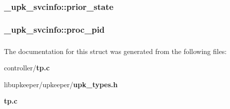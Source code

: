 \subsubsection[{prior\_\-state}]{ {\bf \_\-upk\_\-svcinfo::prior\_\-state}}\label{struct__upk__svcinfo_a771e32befacb58b96ffcfbe52dfccbb1}
\subsubsection[{proc\_\-pid}]{ {\bf \_\-upk\_\-svcinfo::proc\_\-pid}}\label{struct__upk__svcinfo_a1310b2281ade1545a1153f52e8def96c}
\subsubsection[{UPK\_\-V0\_\-SVCINFO\_\-T\_\-FIELDS}]{}\label{struct__upk__svcinfo_a663fac69a32271b907e3cd0a6def2e80}


The documentation for this struct was generated from the following files:\begin{DoxyCompactItemize}
\item 
controller/{\bf tp.c}\item 
libupkeeper/upkeeper/{\bf upk\_\-types.h}\item 
{\bf tp.c}\end{DoxyCompactItemize}
